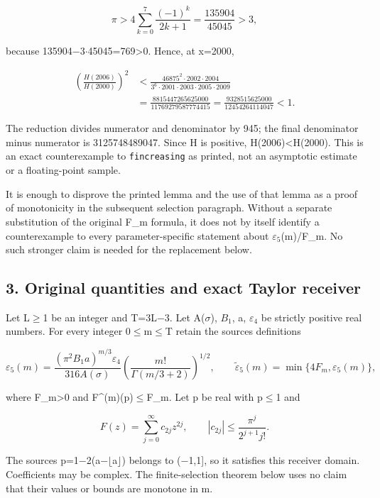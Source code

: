 \[
\pi>4\sum_{k=0}^{7}\frac{(-1)^k}{2k+1}
=\frac{135904}{45045}>3,
\]

because 135904\ensuremath{-}3\ensuremath{\cdot}45045=769\textgreater0. Hence, at x=2000,

\[
\begin{aligned}
\left(\frac{H(2006)}{H(2000)}\right)^2
&<\frac{46875^2\cdot2002\cdot2004}
{3^6\cdot2001\cdot2003\cdot2005\cdot2009}\\
&=\frac{8815447265625000}{11769279587774415}
=\frac{9328515625000}{12454264114047}<1.
\end{aligned}
\]

The reduction divides numerator and denominator by 945; the final denominator minus numerator is 3125748489047. Since H is positive, H(2006)\textless H(2000). This is an exact counterexample to \texttt{fincreasing} as printed, not an asymptotic estimate or a floating-point sample.

It is enough to disprove the printed lemma and the use of that lemma as a proof of monotonicity in the subsequent selection paragraph. Without a separate substitution of the original F\_m formula, it does not by itself identify a counterexample to every parameter-specific statement about \ensuremath{\varepsilon_{5}}(m)/F\_m. No such stronger claim is needed for the replacement below.

\subsection{3. Original quantities and exact Taylor receiver}\label{aindependent:original-quantities-and-exact-taylor-receiver}

Let L\ensuremath{\ge}1 be an integer and T=3L\ensuremath{-}3. Let A(\ensuremath{\sigma}), \ensuremath{B_{1}}, a, \ensuremath{\varepsilon_{4}} be strictly positive real numbers. For every integer 0\ensuremath{\le}m\ensuremath{\le}T retain the source\textquotesingle s definitions

\[
\varepsilon_5(m)
=\frac{(\pi^2 B_1a)^{m/3}\varepsilon_4}{316A(\sigma)}
\left(\frac{m!}{\Gamma(m/3+2)}\right)^{1/2},
\qquad
\widetilde\varepsilon_5(m)=\min\{4F_m,\varepsilon_5(m)\},
\]

where F\_m\textgreater0 and \textbar F\^{}(m)(p)\textbar\ensuremath{\le}F\_m. Let p be real with \textbar p\textbar\ensuremath{\le}1 and

\[
F(z)=\sum_{j=0}^{\infty}c_{2j}z^{2j},\qquad
|c_{2j}|\le\frac{\pi^j}{2^{j+1}j!}.
\]

The source\textquotesingle s p=1\ensuremath{-}2(a\ensuremath{-}\ensuremath{\lfloor}a\ensuremath{\rfloor}) belongs to (\ensuremath{-}1,1{]}, so it satisfies this receiver domain. Coefficients may be complex. The finite-selection theorem below uses no claim that their values or bounds are monotone in m.

